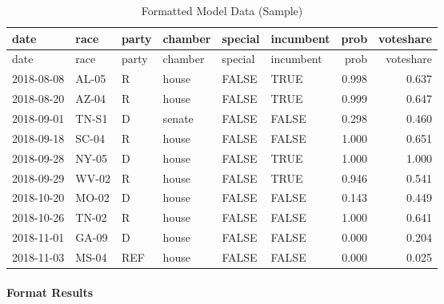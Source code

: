 \documentclass[]{article}
\newenvironment{Shaded}{\begin{snugshade}}{\end{snugshade}}
\newcommand{\CommentTok}[1]{\textcolor[rgb]{0.56,0.35,0.01}{\textit{#1}}}
\newcommand{\DataTypeTok}[1]{\textcolor[rgb]{0.13,0.29,0.53}{#1}}
\newcommand{\DecValTok}[1]{\textcolor[rgb]{0.00,0.00,0.81}{#1}}
\newcommand{\KeywordTok}[1]{\textcolor[rgb]{0.13,0.29,0.53}{\textbf{#1}}}
\newcommand{\NormalTok}[1]{#1}
\newcommand{\OperatorTok}[1]{\textcolor[rgb]{0.81,0.36,0.00}{\textbf{#1}}}
\newcommand{\StringTok}[1]{\textcolor[rgb]{0.31,0.60,0.02}{#1}}
\let\oldparagraph\paragraph
\renewcommand{\paragraph}[1]{\oldparagraph{#1}\mbox{}}
\begin{document}
\begin{longtable}[]{@{}llllllrr@{}}
\caption{Formatted Model Data (Sample)}\tabularnewline
\toprule
date & race & party & chamber & special & incumbent & prob &
voteshare\tabularnewline
\midrule
\endfirsthead
\toprule
date & race & party & chamber & special & incumbent & prob &
voteshare\tabularnewline
\midrule
\endhead
2018-08-08 & AL-05 & R & house & FALSE & TRUE & 0.998 &
0.637\tabularnewline
2018-08-20 & AZ-04 & R & house & FALSE & TRUE & 0.999 &
0.647\tabularnewline
2018-09-01 & TN-S1 & D & senate & FALSE & FALSE & 0.298 &
0.460\tabularnewline
2018-09-18 & SC-04 & R & house & FALSE & FALSE & 1.000 &
0.651\tabularnewline
2018-09-28 & NY-05 & D & house & FALSE & TRUE & 1.000 &
1.000\tabularnewline
2018-09-29 & WV-02 & R & house & FALSE & TRUE & 0.946 &
0.541\tabularnewline
2018-10-20 & MO-02 & D & house & FALSE & FALSE & 0.143 &
0.449\tabularnewline
2018-10-26 & TN-02 & R & house & FALSE & FALSE & 1.000 &
0.641\tabularnewline
2018-11-01 & GA-09 & D & house & FALSE & FALSE & 0.000 &
0.204\tabularnewline
2018-11-03 & MS-04 & REF & house & FALSE & FALSE & 0.000 &
0.025\tabularnewline
\bottomrule
\end{longtable}

\hypertarget{format-results}{%
\paragraph{Format Results}\label{format-results}}

\begin{Shaded}
\end{Shaded}
\end{document}
